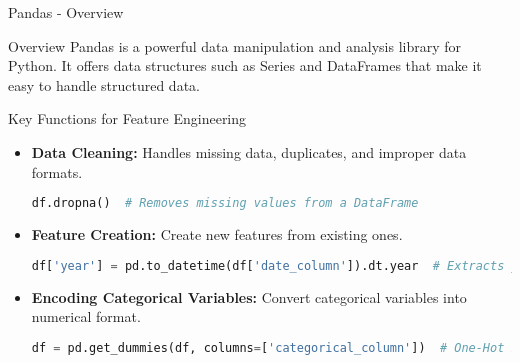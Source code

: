 \documentclass[aspectratio=169]{beamer}
\begin{document}
\begin{frame}[fragile]{Pandas - Overview}
    \begin{block}{Overview}
        Pandas is a powerful data manipulation and analysis library for Python. It offers data structures such as Series and DataFrames that make it easy to handle structured data.
    \end{block}
    
    \begin{block}{Key Functions for Feature Engineering}
        \begin{itemize}
            \item \textbf{Data Cleaning:} Handles missing data, duplicates, and improper data formats.
            \begin{lstlisting}[language=Python]
df.dropna()  # Removes missing values from a DataFrame
            \end{lstlisting}

            \item \textbf{Feature Creation:} Create new features from existing ones.
            \begin{lstlisting}[language=Python]
df['year'] = pd.to_datetime(df['date_column']).dt.year  # Extracts year from a date
            \end{lstlisting}

            \item \textbf{Encoding Categorical Variables:} Convert categorical variables into numerical format.
            \begin{lstlisting}[language=Python]
df = pd.get_dummies(df, columns=['categorical_column'])  # One-Hot Encoding
            \end{lstlisting}
        \end{itemize}
    \end{block}
\end{frame}
\end{document}
